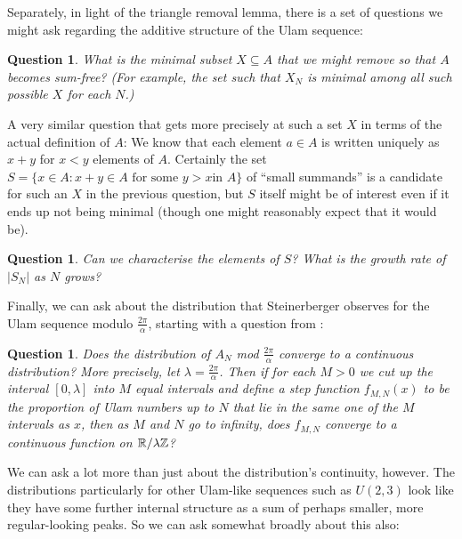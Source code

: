 \documentclass{report}
\newtheorem{question}[theorem]{Question}
\theoremstyle{remark}
\numberwithin{equation}{section}
\begin{document}
Separately, in light of the triangle removal lemma, there is a set of
questions we might ask regarding the additive structure of the Ulam
sequence:

\begin{question}\label{qn:ulam_sumfree}
  What is the minimal subset $X \subseteq A$ that we might remove so
  that $A$ becomes sum-free?  (For example, the set such that $X_N$ is
  minimal among all such possible $X$ for each $N$.)
\end{question}

A very similar question that gets more precisely at such a set $X$ in
terms of the actual definition of $A$: We know that each element
$a \in A$ is written uniquely as $x+y$ for $x < y$ elements of $A$.
Certainly the set $S = \{x \in A : x + y \in A\text{ for some $y > x$
  in $A$}\}$ of ``small summands'' is a candidate for such an $X$ in
the previous question, but $S$ itself might be of interest even if it
ends up not being minimal (though one might reasonably expect that it
would be).

\begin{question}\label{qn:fulcrum}
  Can we characterise the elements of $S$?  What is the growth rate of
  $|S_N|$ as $N$ grows?
\end{question}

Finally, we can ask about the distribution that Steinerberger observes
for the Ulam sequence modulo $\frac{2\pi}{\alpha}$, starting with a
question from \cite{steinerberger:preprint}: 

\begin{question}\label{qn:continuity}
  Does the distribution of $A_N$ mod $\frac{2\pi}{\alpha}$ converge to
  a continuous distribution?  More precisely, let
  $\lambda = \frac{2\pi}{\alpha}$.  Then if for each $M > 0$ we cut up
  the interval $[0,\lambda]$ into $M$ equal intervals and define a
  step function $f_{M,N}(x)$ to be the proportion of Ulam numbers up
  to $N$ that lie in the same one of the $M$ intervals as $x$, then as
  $M$ and $N$ go to infinity, does $f_{M,N}$ converge to a continuous
  function on $\mathbb{R}/\lambda\mathbb{Z}$?
\end{question}

We can ask a lot more than just about the distribution's continuity,
however.  The distributions particularly for other Ulam-like sequences
such as $U(2,3)$ look like they have some further internal structure
as a sum of perhaps smaller, more regular-looking peaks.  So we can
ask somewhat broadly about this also: 
\end{document}

